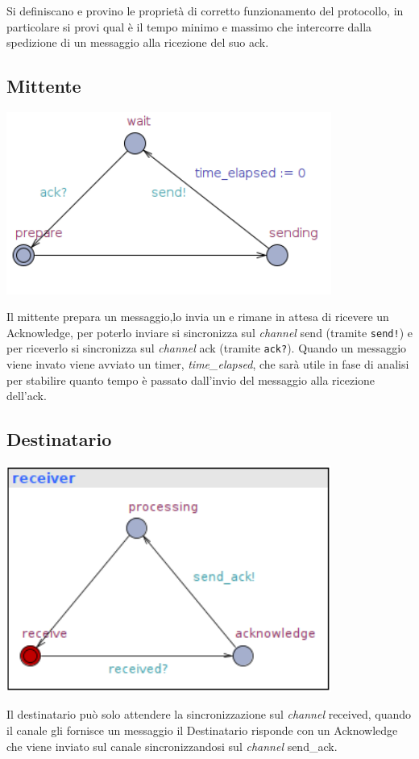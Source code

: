 \documentclass[a4paper]{article}
\newcommand{\channel}{\textit{channel }}
\begin{document}
Si definiscano e provino le proprietà di corretto funzionamento del protocollo, in particolare si provi qual è il tempo minimo e massimo che intercorre dalla spedizione di un messaggio alla ricezione del suo ack.
\subsection{Mittente}
\begin{center}\includegraphics[width=0.8\textwidth]{1_sender.png}\end{center}
Il mittente prepara un messaggio,lo invia un e rimane in attesa di ricevere un Acknowledge, per poterlo inviare si sincronizza sul \channel send (tramite \texttt{send!}) e per riceverlo si sincronizza sul \channel ack (tramite \texttt{ack?}).
Quando un messaggio viene invato viene avviato un timer, \textit{time\_elapsed}, che sarà utile in fase di analisi per stabilire quanto tempo è passato dall'invio del messaggio alla ricezione dell'ack.
\subsection{Destinatario}
\begin{center}\includegraphics[width=0.8\textwidth]{1_receiver.png}\end{center}
Il destinatario può solo attendere la sincronizzazione sul \channel received, quando il canale gli fornisce un messaggio il Destinatario risponde con un Acknowledge che viene inviato sul canale sincronizzandosi sul \channel send\_ack.
\end{document}
